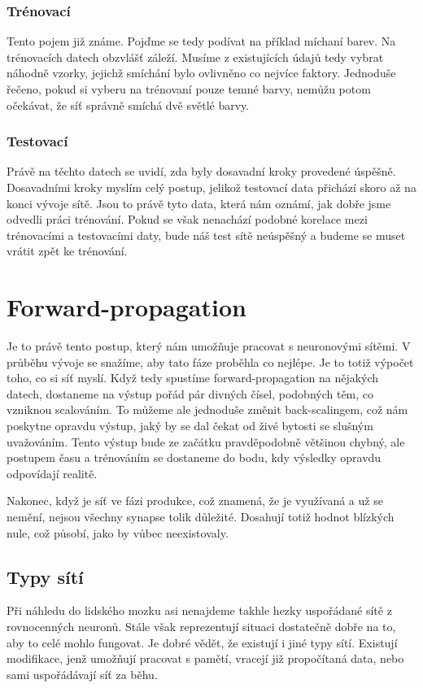 \documentclass[12pt,a4paper]{report}
\begin{document}
		\subsection{Trénovací}
		Tento pojem již známe. Pojďme se tedy podívat na příklad míchaní barev. Na trénovacích datech obzvlášť záleží. Musíme z existujících údajů tedy vybrat náhodně vzorky, jejichž smíchání bylo ovlivněno co nejvíce faktory. Jednoduše řečeno, pokud si vyberu na trénovaní pouze temné barvy, nemůžu potom očekávat, že síť správně smíchá dvě světlé barvy.
		\subsection{Testovací}
		Právě na těchto datech se uvidí, zda byly dosavadní kroky provedené úspěšně. Dosavadními kroky myslím celý postup, jelikož testovací data přichází skoro až na konci vývoje sítě. Jsou to právě tyto data, která nám oznámí, jak dobře jsme odvedli práci trénování. Pokud se však nenachází podobné korelace mezi trénovacími a testovacími daty, bude náš test sítě neúspěšný a budeme se muset vrátit zpět ke trénování.
\chapter{Forward-propagation}
	Je to právě tento postup, který nám umožňuje pracovat s neuronovými sítěmi. V průběhu vývoje se snažíme, aby tato fáze proběhla co nejlépe. Je to totiž výpočet toho, co si síť myslí. Když tedy spustíme forward-propagation na nějakých datech, dostaneme na výstup pořád pár divných čísel, podobných těm, co vzniknou scalováním. To můžeme ale jednoduše změnit back-scalingem, což nám poskytne opravdu výstup, jaký by se dal čekat od živé bytosti se slušným uvažováním. Tento výstup bude ze začátku pravděpodobně většinou chybný, ale postupem času a trénováním se dostaneme do bodu, kdy výsledky opravdu odpovídají realitě.
	
	Nakonec, když je síť ve fázi produkce, což znamená, že je využívaná a už se nemění, nejsou všechny synapse tolik důležité. Dosahují totiž hodnot blízkých nule, což působí, jako by vůbec neexistovaly.
	\section{Typy sítí}
	Při náhledu do lidského mozku asi nenajdeme takhle hezky uspořádané sítě z rovnocenných neuronů. Stále však reprezentují situaci dostatečně dobře na to, aby to celé mohlo fungovat. Je dobré vědět, že existují i jiné typy sítí. Existují modifikace, jenž umožňují pracovat s pamětí, vracejí již propočítaná data, nebo sami uspořádávají síť za běhu.
\end{document}
